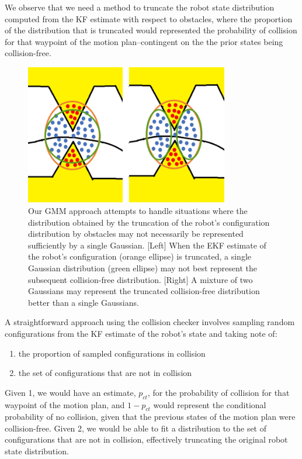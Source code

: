 \documentclass[journal]{IEEEtran}
\begin{document}
We observe that we need a method to truncate the robot state distribution computed from the KF estimate with respect to obstacles, where the proportion of the distribution that is truncated would represented the probability of collision for that waypoint of the motion plan--contingent on the the prior states being collision-free.

\begin{figure}[!t]
\centering
\includegraphics[width=3.5in]{combined_pic.png}
\caption{Our GMM approach attempts to handle situations where the distribution obtained by the truncation of the robot's configuration distribution by obstacles may not necessarily be represented sufficiently by a single Gaussian. [Left] When the EKF estimate of the robot's configuration (orange ellipse) is truncated, a single Gaussian distribution (green ellipse) may not best represent the subsequent collision-free distribution. [Right] A mixture of two Gaussians may represent the truncated collision-free distribution better than a single Gaussians.}
\label{ajaay_justification}
\end{figure}

A straightforward approach using the collision checker involves sampling random configurations from the KF estimate of the robot's state and taking note of:
\begin{enumerate}
\item the proportion of sampled configurations in collision
\item the set of configurations that are not in collision
\end{enumerate}

Given 1, we would have an estimate, $p_{ct}$, for the probability of collision for that waypoint of the motion plan, and $1 - p_{ct}$ would represent the conditional probability of no collision, given that the previous states of the motion plan were collision-free. Given 2, we would be able to fit a distribution to the set of configurations that are not in collision, effectively truncating the original robot state distribution.
\end{document}
